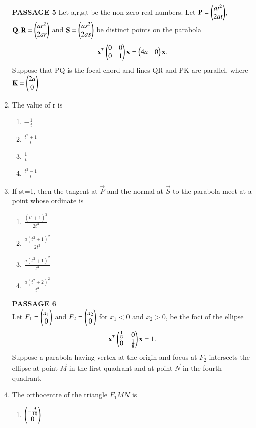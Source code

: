 \documentclass[journal,12pt,twocolumn]{IEEEtran}
\begin{document}
\begin{enumerate}[label=\arabic*]
    \textbf{PASSAGE 5}
    Let a,r,s,t be the non zero real numbers. Let $\mathbf{P}=\begin{pmatrix}at^2\\2at\end{pmatrix}$,$\mathbf{Q,R}=			\begin{pmatrix}ar^2\\2ar\end{pmatrix}$ and $\mathbf{S}=\begin{pmatrix}as^2\\2as\end{pmatrix}$ be distinct points on the parabola 
    \begin{align}
    \mathbf{x}^T\begin{pmatrix}0&0\\0&1\end{pmatrix}\mathbf{x}=\begin{pmatrix}4a&0\end{pmatrix}\mathbf{x}.
    \end{align} Suppose that PQ is the focal chord and lines QR and PK are parallel, where 
    $\mathbf{K}=\begin{pmatrix}2a\\0\end{pmatrix}$
    \item The value of r is 
    \begin{enumerate}
    \item $-\frac{1}{t}$
    \item $\frac{t^2+1}{t}$
    \item $\frac{1}{t}$
    \item $\frac{t^2-1}{t}$
    \end{enumerate}
    \item If st=1, then the tangent at $\vec{P}$ and the normal at $\vec{S}$ to the parabola meet at a point whose ordinate is 
   \begin{enumerate} 
   \item $\frac{(t^2+1)^2}{2t^3}$
   \item $\frac {a(t^2+1)^2}{2t^3}$
   \item $\frac {a(t^2+1)^2}{t^3}$
   \item $\frac {a(t^2+2)^2}{t^3}$
   \end{enumerate}   
   \textbf{PASSAGE 6}\\
   Let $F_1 = \begin{pmatrix}x_1\\0\end{pmatrix}$ and 
   $F_2 = \begin{pmatrix}x_2\\0\end{pmatrix}$ for $x_1<0$ and $x_2>0$, be the foci of the ellipse 
   \begin{align}
   \mathbf{x}^T\begin{pmatrix}\frac{1}{9}&0\\0&\frac{1}{8}\end{pmatrix}\mathbf{x}=1.
   \end{align} Suppose a parabola having vertex at the origin and focus at $F_2$ intersects the ellipse at point $\vec{M}$ in the first quadrant and at point $\vec{N}$ in the fourth quadrant.
    \item The orthocentre of the triangle $F_1MN$ is 
    \begin{enumerate}
    \item $\begin{pmatrix}-\frac{9}{10}\\0\end{pmatrix}$

\end{enumerate}
\end{enumerate}
\end{document}
